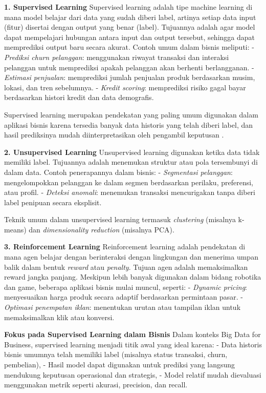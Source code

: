 \textbf{1. Supervised Learning}  
Supervised learning adalah tipe machine learning di mana model belajar dari data yang sudah diberi label, artinya setiap data input (fitur) disertai dengan output yang benar (label). Tujuannya adalah agar model dapat mempelajari hubungan antara input dan output tersebut, sehingga dapat memprediksi output baru secara akurat.  
Contoh umum dalam bisnis meliputi:
- \textit{Prediksi churn pelanggan}: menggunakan riwayat transaksi dan interaksi pelanggan untuk memprediksi apakah pelanggan akan berhenti berlangganan.
- \textit{Estimasi penjualan}: memprediksi jumlah penjualan produk berdasarkan musim, lokasi, dan tren sebelumnya.
- \textit{Kredit scoring}: memprediksi risiko gagal bayar berdasarkan histori kredit dan data demografis.

Supervised learning merupakan pendekatan yang paling umum digunakan dalam aplikasi bisnis karena tersedia banyak data historis yang telah diberi label, dan hasil prediksinya mudah diinterpretasikan oleh pengambil keputusan \cite{chen2012,davenport2018}.

\textbf{2. Unsupervised Learning}  
Unsupervised learning digunakan ketika data tidak memiliki label. Tujuannya adalah menemukan struktur atau pola tersembunyi di dalam data.  
Contoh penerapannya dalam bisnis:
- \textit{Segmentasi pelanggan}: mengelompokkan pelanggan ke dalam segmen berdasarkan perilaku, preferensi, atau profil.
- \textit{Deteksi anomali}: menemukan transaksi mencurigakan tanpa diberi label penipuan secara eksplisit.

Teknik umum dalam unsupervised learning termasuk \textit{clustering} (misalnya k-means) dan \textit{dimensionality reduction} (misalnya PCA).

\textbf{3. Reinforcement Learning}  
Reinforcement learning adalah pendekatan di mana agen belajar dengan berinteraksi dengan lingkungan dan menerima umpan balik dalam bentuk \textit{reward} atau \textit{penalty}. Tujuan agen adalah memaksimalkan reward jangka panjang.  
Meskipun lebih banyak digunakan dalam bidang robotika dan game, beberapa aplikasi bisnis mulai muncul, seperti:
- \textit{Dynamic pricing}: menyesuaikan harga produk secara adaptif berdasarkan permintaan pasar.
- \textit{Optimasi penempatan iklan}: menentukan urutan atau tampilan iklan untuk memaksimalkan klik atau konversi.

\textbf{Fokus pada Supervised Learning dalam Bisnis}  
Dalam konteks Big Data for Business, supervised learning menjadi titik awal yang ideal karena:
- Data historis bisnis umumnya telah memiliki label (misalnya status transaksi, churn, pembelian),
- Hasil model dapat digunakan untuk prediksi yang langsung mendukung keputusan operasional dan strategis,
- Model relatif mudah dievaluasi menggunakan metrik seperti akurasi, precision, dan recall.

